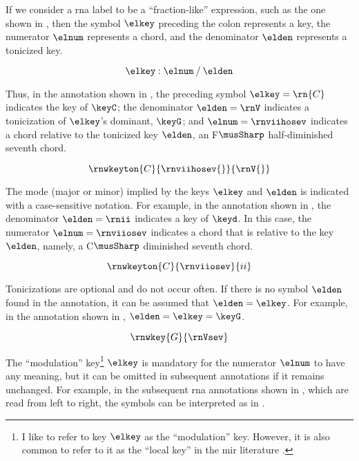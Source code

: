 
If we consider a \gls{rna} label to be a ``fraction-like''
expression, such as the one shown in ,
then the symbol $\elkey$ preceding the colon represents a
key, the numerator $\elnum$ represents a chord, and the
denominator $\elden$ represents a tonicized key.

\begin{equation}
    \label{eq:rn_expression}
    \elkey : \elnum \: / \: \elden
\end{equation}

Thus, in the annotation shown in , the
preceding symbol $\elkey=\rn{C}$ indicates the key of
$\keyC$; the denominator $\elden = \rnV$ indicates a
tonicization of $\elkey$'s dominant, $\keyG$; and
$\elnum=\rnviihosev$ indicates a chord relative to the
tonicized key $\elden$, an F$\musSharp$ half-diminished
seventh chord.

\begin{equation}
    \label{eq:rn_example1}
    \rnwkeyton{C}{\rnviihosev{}}{\rnV{}}
\end{equation}


The mode (major or minor) implied by the keys $\elkey$ and
$\elden$ is indicated with a case-sensitive notation. For
example, in the annotation shown in , the
denominator $\elden=\rnii$ indicates a key of $\keyd$. In
this case, the numerator $\elnum = \rnviiosev$ indicates a
chord that is relative to the key $\elden$, namely, a
C$\musSharp$ diminished seventh chord.

\begin{equation}
    \label{eq:rn_example2}
    \rnwkeyton{C}{\rnviiosev}{ii}
\end{equation}

Tonicizations are optional and do not occur often. If there
is no symbol $\elden$ found in the annotation, it can be
assumed that $\elden = \elkey$. For example, in the
annotation shown in , $\elden = \elkey =
\keyG$.

\begin{equation}
    \label{eq:rn_example3}
    \rnwkey{G}{\rnVsev}
\end{equation}

The ``modulation'' key\footnote{I like to refer to key
$\elkey$ as the ``modulation'' key. However, it is also
common to refer to it as the ``local key'' in the \gls{mir}
literature \parencite{napoleslopez2020local}.} $\elkey$ is
mandatory for the numerator $\elnum$ to have any meaning,
but it can be omitted in subsequent annotations if it
remains unchanged. For example, in the subsequent \gls{rna}
annotations shown in , which are
read from left to right, the symbols can be interpreted as
in .

